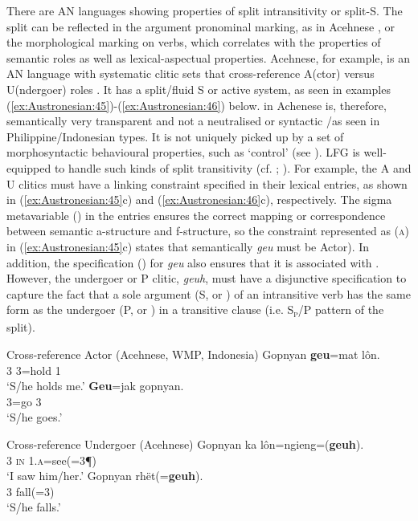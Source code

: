\documentclass[output=paper,chinesefont]{../langscibook}
\begin{document}
There are AN languages showing properties of split intransitivity or split-S. The split can be reflected in the argument pronominal marking, as in Acehnese \citep{Durie1987}, or the morphological marking on verbs, which correlates with the properties of semantic roles as well as lexical-aspectual properties. Acehnese, for example, is an AN language with systematic clitic sets that cross-reference A(ctor) versus U(ndergoer) roles \citep{Durie1987}. It has a split/fluid S or active system, as seen in examples (\ref{ex:Austronesian:45})-(\ref{ex:Austronesian:46}) below. \SUBJ in Achenese is, therefore, semantically very transparent and not a neutralised or syntactic \SUBJ/\PIVOT as seen in Philippine/Indonesian types. It is not uniquely picked up by a set of morphosyntactic behavioural properties, such as `control' (see ). LFG is well-equipped to handle such kinds of split transitivity (cf. \citealt{zaenen93}; \citealt{arka2003}). For example, the A and U clitics must have a linking constraint specified in their lexical entries, as shown in (\ref{ex:Austronesian:45}c) and (\ref{ex:Austronesian:46}c), respectively. The sigma metavariable (\UPS) in the entries ensures the correct mapping or correspondence between semantic a-structure and f-structure, so the constraint represented as (\UPS\textsc{a}) in (\ref{ex:Austronesian:45}c) states that semantically \emph{geu} must be Actor). In addition, the specification (\UP\SUBJ) for \emph{geu} also ensures that it is associated with \SUBJ. However, the undergoer or P clitic, \emph{geuh}, must have a disjunctive specification to capture the fact that a sole argument (S, or \SUBJ) of an intransitive verb has the same form as the undergoer (P, or \OBJ) in a transitive clause (i.e. S\textsubscript{\textsc{p}}/P pattern of the split).

\ea\label{ex:Austronesian:45} Cross-reference Actor (Acehnese, WMP, Indonesia)  \citep[366]{Durie1987}
\ea\gll
Gopnyan \textbf{geu}=mat lôn. \\
3 3\A=hold {1\SG} \\
\glt`S/he holds me.'
\ex\gll
\textbf{Geu}=jak gopnyan.\\
3\A=go 3\\
\glt`S/he goes.'
\ex
{}
\z\z

\ea\label{ex:Austronesian:46} Cross-reference Undergoer (Acehnese) \citep[369]{Durie1987}
\ea\gll
Gopnyan ka lôn=ngieng=(\textbf{geuh}). \\
3 \textsc{in} {1\SG}.\textsc{a}=see(=3\P) \\
\glt`I saw him/her.'
\ex\gll
Gopnyan rhët(=\textbf{geuh}).\\
3   fall(=3)\\
\glt`S/he falls.'
\ex
{}
\z\z
\end{document}
